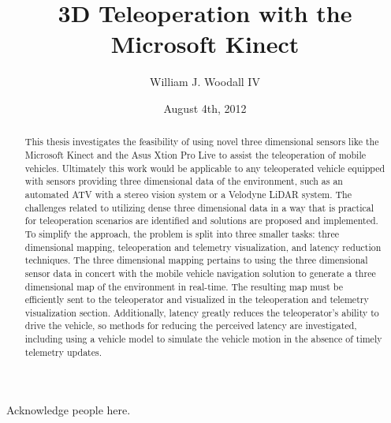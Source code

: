 \documentclass[12pt]{report}
\title{3D Teleoperation with the Microsoft Kinect}
\author{William J. Woodall IV}
\date{August 4th, 2012} %
\begin{document}

\begin{romanpages}      %

\TitlePage 


\begin{abstract} 
This thesis investigates the feasibility of using novel three dimensional sensors like the Microsoft Kinect\cite{KINECT} and the Asus Xtion Pro Live\cite{ASUS} to assist the teleoperation of mobile vehicles.  Ultimately this work would be applicable to any teleoperated vehicle equipped with sensors providing three dimensional data of the environment, such as an automated ATV with a stereo vision system or a Velodyne LiDAR\cite{halterman2010velodyne} system.  The challenges related to utilizing dense three dimensional data in a way that is practical for teleoperation scenarios are identified and solutions are proposed and implemented.  To simplify the approach, the problem is split into three smaller tasks: three dimensional mapping, teleoperation and telemetry visualization, and latency reduction techniques.  The three dimensional mapping pertains to using the three dimensional sensor data in concert with the mobile vehicle navigation solution to generate a three dimensional map of the environment in real-time.  The resulting map must be efficiently sent to the teleoperator and visualized in the teleoperation and telemetry visualization section.  Additionally, latency greatly reduces the teleoperator's ability to drive the vehicle, so methods for reducing the perceived latency are investigated, including using a vehicle model to simulate the vehicle motion in the absence of timely telemetry updates.
\end{abstract}


\begin{acknowledgments}
Acknowledge people here.
\end{acknowledgments}

\tableofcontents
\listoffigures
\listoftables
\listofalgorithms

\printnomenclature[0.5in] %
\end{romanpages}        %
\end{document}
